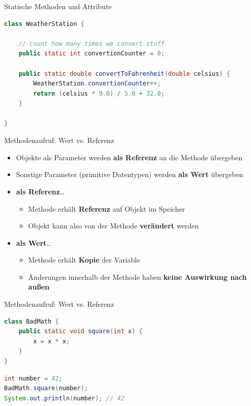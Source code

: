 \documentclass[18pt]{beamer}
\begin{document}
\begin{frame}[fragile]{Statische Methoden und Attribute}
    \begin{exampleblock}{}
        \begin{lstlisting}[language=Java,basicstyle=\scriptsize]
class WeatherStation {

    // count how many times we convert stuff
    public static int convertionCounter = 0;

    public static double convertToFahrenheit(double celsius) {
        WeatherStation.convertionCounter++;
        return (celsius * 9.0) / 5.0 + 32.0;
    }

}
        \end{lstlisting}
    \end{exampleblock}
\end{frame}

\begin{frame}{Methodenaufruf: Wert vs. Referenz}
    \begin{itemize}
        \item Objekte als Parameter werden \textbf{als Referenz} an die Methode übergeben
        \item Sonstige Parameter (primitive Datentypen) werden \textbf{als Wert} übergeben
        \vspace{.2in}
        \item \textbf{als Referenz}\dots
        \begin{itemize}
            \item Methode erhält \textbf{Referenz} auf Objekt im Speicher
            \item Objekt kann also von der Methode \textbf{verändert} werden
        \end{itemize}
        \item \textbf{als Wert}\dots
        \begin{itemize}
            \item Methode erhält \textbf{Kopie} der Variable
            \item Änderungen innerhalb der Methode haben \textbf{keine Auswirkung nach außen}
        \end{itemize}
    \end{itemize}
\end{frame}

\begin{frame}[fragile]{Methodenaufruf: Wert vs. Referenz}
    \begin{alertblock}{}
        \begin{lstlisting}[language=Java]
class BadMath {
    public static void square(int x) {
        x = x * x;
    }
}
        \end{lstlisting}
    \end{alertblock}

    \begin{lstlisting}[language=Java]
int number = 42;
BadMath.square(number);
System.out.println(number); // 42
    \end{lstlisting}
\end{frame}
\end{document}
